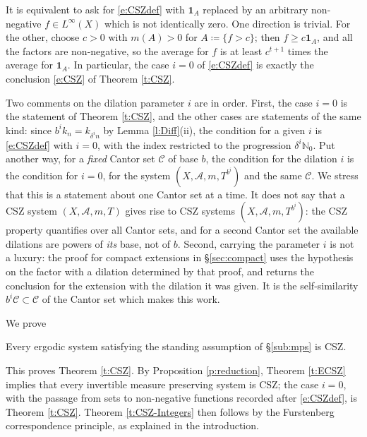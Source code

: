 It is equivalent to ask for \eqref{e:CSZdef} with $\mathbf 1_A$ replaced by an arbitrary non-negative $f \in L ^{\infty}(X)$ 
which is not identically zero.  One direction is trivial.  For the other, choose $c>0$ with $m(A)>0$ for $A \coloneqq \{f>c\}$; 
then $f \geq c \mathbf 1_A$, and all the factors are non-negative, so the average for $f$ is at least $c ^{t+1}$ times the average for $\mathbf 1_A$.  
In particular, the case $i=0$ of \eqref{e:CSZdef} is exactly the conclusion \eqref{e:CSZ} of Theorem \ref{t:CSZ}.  

Two comments on the dilation parameter $i$ are in order.  First, the case $i=0$ is the statement of Theorem \ref{t:CSZ}, 
and the other cases are statements of the same kind: since $b ^{i} k_n = k _{\delta ^{i} n}$ by Lemma \ref{l:Diff}(ii), 
the condition for a given $i$ is \eqref{e:CSZdef} with $i=0$, with the index restricted to the progression $\delta ^{i} \mathbb N_0$.  
Put another way, for a \emph{fixed} Cantor set $\mathcal C$ of base $b$, the condition for the dilation $i$ is the condition for $i=0$, 
for the system $(X,\mathcal A,m,T ^{b ^{i}})$ and the same $\mathcal C$.  
We stress that this is a statement about one Cantor set at a time.  It does not say that a CSZ system $(X,\mathcal A,m,T)$ gives rise to 
CSZ systems $(X,\mathcal A, m, T ^{b ^{i}})$: the CSZ property quantifies over all Cantor sets, and for a second Cantor set the available 
dilations are powers of \emph{its} base, not of $b$.  
Second, carrying the parameter $i$ is not a luxury: the proof for compact extensions in \S\ref{sec:compact} 
uses the hypothesis on the factor with a dilation determined by that proof, and returns the conclusion 
for the extension with the dilation it was given.  It is the self-similarity $b ^{i}\mathcal C \subset \mathcal C$ of the Cantor set which makes this  work.  

We prove 

\begin{theorem} \label{t:ECSZ}
    Every ergodic system satisfying the standing assumption of \S\ref{sub:mps} is CSZ.  
\end{theorem}

This proves Theorem \ref{t:CSZ}.  By Proposition \ref{p:reduction}, Theorem \ref{t:ECSZ} implies that every invertible measure preserving system is CSZ; 
the case $i=0$, with the passage from sets to non-negative functions recorded after \eqref{e:CSZdef}, is Theorem \ref{t:CSZ}.  
Theorem \ref{t:CSZ-Integers} then follows by the Furstenberg correspondence principle, 
as explained in the introduction.  

